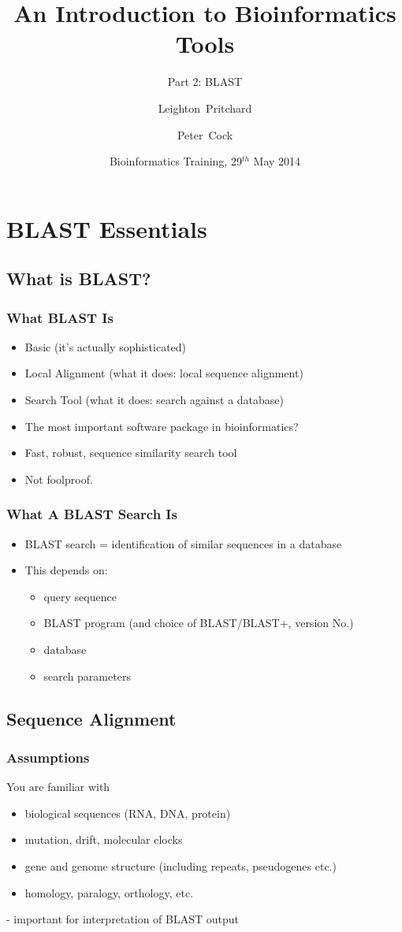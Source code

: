 \documentclass[table]{beamer}
\title[Intro to Bioinformatics] %
{An Introduction to Bioinformatics Tools}
\subtitle{Part 2: BLAST}
\author[Pritchard, Cock] %
{Leighton~Pritchard \and Peter~Cock}
\institute[The James Hutton Institute] %
{
  Information and Computational Sciences\\
  The James Hutton Institute
}
\date[May 2014] %
{Bioinformatics Training, 29$^{th}$ May 2014}
\begin{document}
  \frame[plain]{\titlepage}
  
  \section{BLAST Essentials}
  
    \subsection{What is BLAST?}
    \begin{frame}
     \frametitle{What BLAST Is}
     \begin{itemize}
       \item Basic (it's actually sophisticated)
       \item Local Alignment (what it does: local sequence alignment)
       \item Search Tool (what it does: search against a database)
       \item The most important software package in bioinformatics?
       \item Fast, robust, sequence similarity search tool
       \item Not foolproof.
     \end{itemize}
    \end{frame}
  
    \begin{frame}
     \frametitle{What A BLAST Search Is}
     \begin{itemize}
       \item BLAST search = identification of similar sequences in a database
       \item This depends on:
       \begin{itemize}
         \item query sequence
         \item BLAST program (and choice of BLAST/BLAST+, version No.)
         \item database
         \item search parameters
       \end{itemize}
     \end{itemize}
    \end{frame}  
  
    \subsection{Sequence Alignment}
    \begin{frame}
     \frametitle{Assumptions}
     You are familiar with
     \begin{itemize}
       \item biological sequences (RNA, DNA, protein)
       \item mutation, drift, molecular clocks
       \item gene and genome structure (including repeats, pseudogenes etc.)
       \item homology, paralogy, orthology, etc.
     \end{itemize}
     - important for interpretation of BLAST output
    \end{frame}
    
\end{document}
